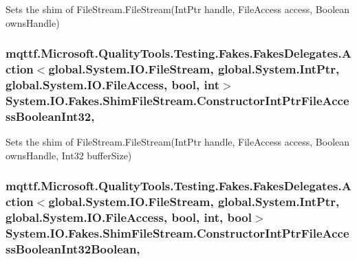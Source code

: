 Sets the shim of File\-Stream.\-File\-Stream(\-Int\-Ptr handle, File\-Access access, Boolean owns\-Handle)

\hypertarget{class_system_1_1_i_o_1_1_fakes_1_1_shim_file_stream_ac31f588420a8b9ddb6ba1ae1f75140aa}{
\subsubsection[{Constructor\-Int\-Ptr\-File\-Access\-Boolean\-Int32}]{\setlength{\rightskip}{0pt plus 5cm}mqttf.\-Microsoft.\-Quality\-Tools.\-Testing.\-Fakes.\-Fakes\-Delegates.\-Action$<$global.\-System.\-I\-O.\-File\-Stream, global.\-System.\-Int\-Ptr, global.\-System.\-I\-O.\-File\-Access, bool, int$>$ System.\-I\-O.\-Fakes.\-Shim\-File\-Stream.\-Constructor\-Int\-Ptr\-File\-Access\-Boolean\-Int32\hspace{0.3cm}{\ttfamily [static]}, {\ttfamily [set]}}}\label{class_system_1_1_i_o_1_1_fakes_1_1_shim_file_stream_ac31f588420a8b9ddb6ba1ae1f75140aa}


Sets the shim of File\-Stream.\-File\-Stream(\-Int\-Ptr handle, File\-Access access, Boolean owns\-Handle, Int32 buffer\-Size)

\hypertarget{class_system_1_1_i_o_1_1_fakes_1_1_shim_file_stream_a83107b287fdc87c6f6f2433f144549e2}{
\subsubsection[{Constructor\-Int\-Ptr\-File\-Access\-Boolean\-Int32\-Boolean}]{\setlength{\rightskip}{0pt plus 5cm}mqttf.\-Microsoft.\-Quality\-Tools.\-Testing.\-Fakes.\-Fakes\-Delegates.\-Action$<$global.\-System.\-I\-O.\-File\-Stream, global.\-System.\-Int\-Ptr, global.\-System.\-I\-O.\-File\-Access, bool, int, bool$>$ System.\-I\-O.\-Fakes.\-Shim\-File\-Stream.\-Constructor\-Int\-Ptr\-File\-Access\-Boolean\-Int32\-Boolean\hspace{0.3cm}{\ttfamily [static]}, {\ttfamily [set]}}}\label{class_system_1_1_i_o_1_1_fakes_1_1_shim_file_stream_a83107b287fdc87c6f6f2433f144549e2}


